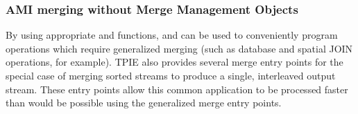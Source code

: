 


\subsubsection{AMI merging without Merge Management Objects}


 By using
appropriate  and
 functions,
 and
 can be
used to conveniently program operations which require
generalized merging (such as database and spatial JOIN
operations, for example).  TPIE also provides several merge
entry points for the special case of merging sorted streams
to produce a single, interleaved output stream.  These entry
points allow this common application to be processed faster
than would be possible using the generalized merge entry
points.


